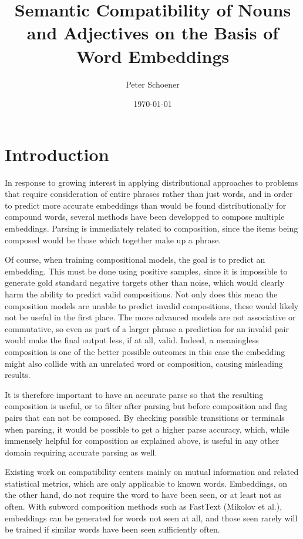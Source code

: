 \documentclass[a4paper, 11pt]{scrartcl}
\begin{document}
\title{Semantic Compatibility of Nouns and Adjectives on the Basis of Word Embeddings}
\author{Peter Schoener}
\date{\today}
\maketitle
\clearpage

\tableofcontents
\clearpage

\section{Introduction}

In response to growing interest in applying distributional approaches to problems that require consideration of entire phrases rather than just words, and in order to predict more accurate embeddings than would be found distributionally for compound words, several methods have been developped to compose multiple embeddings. Parsing is immediately related to composition, since the items being composed would be those which together make up a phrase.

Of course, when training compositional models, the goal is to predict an embedding. This must be done using positive samples, since it is impossible to generate gold standard negative targets other than noise, which would clearly harm the ability to predict valid compositions. Not only does this mean the composition models are unable to predict invalid compositions, these would likely not be useful in the first place. The more advanced models are not associative or commutative, so even as part of a larger phrase a prediction for an invalid pair would make the final output less, if at all, valid. Indeed, a meaningless composition is one of the better possible outcomes in this case \textemdash the embedding might also collide with an unrelated word or composition, causing misleading results.

It is therefore important to have an accurate parse so that the resulting composition is useful, or to filter after parsing but before composition and flag pairs that can not be composed. By checking possible transitions or terminals when parsing, it would be possible to get a higher parse accuracy, which, while immensely helpful for composition as explained above, is useful in any other domain requiring accurate parsing as well.

Existing work on compatibility centers mainly on mutual information and related statistical metrics, which are only applicable to known words. Embeddings, on the other hand, do not require the word to have been seen, or at least not as often. With subword composition methods such as FastText (Mikolov et al.), embeddings can be generated for words not seen at all, and those seen rarely will be trained if similar words have been seen sufficiently often.
\end{document}
